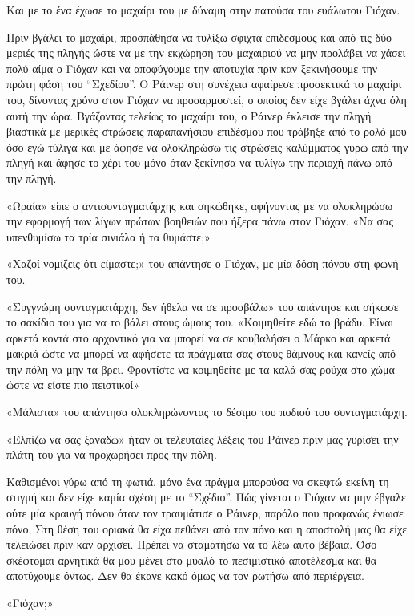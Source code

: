 \documentclass[12pt,twoside, openany]{book}
\begin{document}
Και με το ένα έχωσε το μαχαίρι του με δύναμη στην πατούσα του ευάλωτου Γιόχαν. 

Πριν βγάλει το μαχαίρι, προσπάθησα να τυλίξω σφιχτά επιδέσμους και από τις δύο μεριές της πληγής ώστε να με την εκχώρηση του μαχαιριού να μην προλάβει να χάσει πολύ αίμα ο Γιόχαν και να αποφύγουμε την αποτυχία πριν καν ξεκινήσουμε την πρώτη φάση του “Σχεδίου”. Ο Ράινερ στη συνέχεια αφαίρεσε προσεκτικά το μαχαίρι του, δίνοντας χρόνο στον Γιόχαν να προσαρμοστεί, ο οποίος δεν είχε βγάλει άχνα όλη αυτή την ώρα. Βγάζοντας τελείως το μαχαίρι του, ο Ράινερ έκλεισε την πληγή βιαστικά με μερικές στρώσεις παραπανήσιου επιδέσμου που τράβηξε από το ρολό μου όσο εγώ τύλιγα και με άφησε να ολοκληρώσω τις στρώσεις καλύμματος γύρω από την πληγή και άφησε το χέρι του μόνο όταν ξεκίνησα να τυλίγω την περιοχή πάνω από την πληγή.

«Ωραία» είπε ο αντισυνταγματάρχης και σηκώθηκε, αφήνοντας με να ολοκληρώσω την εφαρμογή των λίγων πρώτων βοηθειών που ήξερα πάνω στον Γιόχαν. «Να σας υπενθυμίσω τα τρία σινιάλα ή τα θυμάστε;»

«Χαζοί νομίζεις ότι είμαστε;» του απάντησε ο Γιόχαν, με μία δόση πόνου στη φωνή του.

«Συγγνώμη συνταγματάρχη, δεν ήθελα να σε προσβάλω» του απάντησε και σήκωσε το σακίδιο του για να το βάλει στους ώμους του. «Κοιμηθείτε εδώ το βράδυ. Είναι αρκετά κοντά στο αρχοντικό για να μπορεί να σε κουβαλήσει ο Μάρκο και αρκετά μακριά ώστε να μπορεί να αφήσετε τα πράγματα σας στους θάμνους και κανείς από την πόλη να μην τα βρει. Φροντίστε να κοιμηθείτε με τα καλά σας ρούχα στο χώμα ώστε να είστε πιο πειστικοί»

«Μάλιστα» του απάντησα ολοκληρώνοντας το δέσιμο του ποδιού του συνταγματάρχη.

«Ελπίζω να σας ξαναδώ» ήταν οι τελευταίες λέξεις του Ράινερ πριν μας γυρίσει την πλάτη του για να προχωρήσει προς την πόλη.

Καθισμένοι γύρω από τη φωτιά, μόνο ένα πράγμα μπορούσα να σκεφτώ εκείνη τη στιγμή και δεν είχε καμία σχέση με το “Σχέδιο”. Πώς γίνεται ο Γιόχαν να μην έβγαλε ούτε μία κραυγή πόνου όταν τον τραυμάτισε ο Ράινερ, παρόλο που προφανώς ένιωσε πόνο; Στη θέση του οριακά θα είχα πεθάνει από τον πόνο και η αποστολή μας θα είχε τελειώσει πριν καν αρχίσει. Πρέπει να σταματήσω να το λέω αυτό βέβαια. Όσο σκέφτομαι αρνητικά θα μου μένει στο μυαλό το πεσιμιστικό αποτέλεσμα και θα αποτύχουμε όντως. Δεν θα έκανε κακό όμως να τον ρωτήσω από περιέργεια.

«Γιόχαν;»
\end{document}
